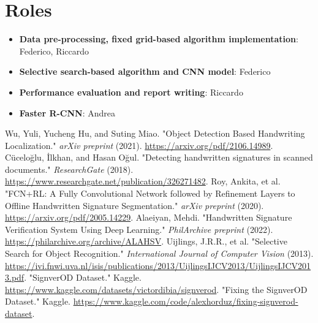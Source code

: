 \documentclass[a4paper,12pt]{article}
\begin{document}
\section{Roles}
\begin{itemize}
    \item \textbf{Data pre-processing, fixed grid-based algorithm implementation}: Federico, Riccardo
    \item \textbf{Selective search-based algorithm and CNN model}: Federico
    \item \textbf{Performance evaluation and report writing}: Riccardo
    \item \textbf{Faster R-CNN}: Andrea
\end{itemize}

\begin{thebibliography}{9}
 Wu, Yuli, Yucheng Hu, and Suting Miao. "Object Detection Based Handwriting Localization." \textit{arXiv preprint} (2021). \url{https://arxiv.org/pdf/2106.14989}.
 Cüceloğlu, İlkhan, and Hasan Oğul. "Detecting handwritten signatures in scanned documents." \textit{ResearchGate} (2018). \url{https://www.researchgate.net/publication/326271482}.
 Roy, Ankita, et al. "FCN+RL: A Fully Convolutional Network followed by Refinement Layers to Offline Handwritten Signature Segmentation." \textit{arXiv preprint} (2020). \url{https://arxiv.org/pdf/2005.14229}.
 Alaeiyan, Mehdi. "Handwritten Signature Verification System Using Deep Learning." \textit{PhilArchive preprint} (2022). \url{https://philarchive.org/archive/ALAHSV}.
 Uijlings, J.R.R., et al. "Selective Search for Object Recognition." \textit{International Journal of Computer Vision} (2013). \url{https://ivi.fnwi.uva.nl/isis/publications/2013/UijlingsIJCV2013/UijlingsIJCV2013.pdf}.
 "SignverOD Dataset." Kaggle. \url{https://www.kaggle.com/datasets/victordibia/signverod}.
 "Fixing the SignverOD Dataset." Kaggle. \url{https://www.kaggle.com/code/alexhorduz/fixing-signverod-dataset}.
\end{thebibliography}
\end{document}
